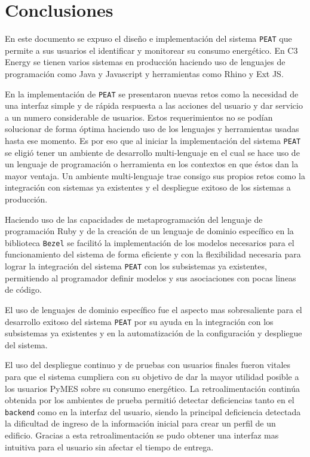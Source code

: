\chapter{Conclusiones}

En este documento se expuso el diseño e implementación del sistema \texttt{PEAT} que
permite a sus usuarios el identificar y monitorear su consumo energético. En C3
Energy se tienen varios sistemas en producción haciendo uso de lenguajes de
programación como Java y Javascript y herramientas como Rhino y Ext JS.

En la implementación de \texttt{PEAT} se presentaron nuevas retos como la necesidad
de una interfaz simple y de rápida respuesta a las acciones del usuario y
dar servicio a un numero considerable de usuarios.
Estos requerimientos no se podían solucionar de forma óptima haciendo uso de los
lenguajes y herramientas usadas hasta ese momento. Es por eso que al iniciar
la implementación del sistema \texttt{PEAT} se eligió tener un ambiente de
desarrollo multi-lenguaje en el cual se hace uso de un lenguaje de programación
o herramienta en los contextos en que éstos dan la mayor ventaja. Un ambiente
multi-lenguaje trae consigo sus propios retos como la integración con sistemas ya
existentes y el despliegue exitoso de los sistemas a producción.

Haciendo uso de las capacidades de metaprogramación del lenguaje de programación
Ruby y de la creación de un lenguaje de dominio específico en la biblioteca
\texttt{Bezel} se facilitó la implementación de los modelos necesarios para
el funcionamiento del sistema de forma eficiente y con la flexibilidad necesaria
para lograr la integración del sistema \texttt{PEAT} con los subsistemas ya
existentes, permitiendo al programador definir modelos y sus asociaciones con
pocas lineas de código.

El uso de lenguajes de dominio específico fue el aspecto mas sobresaliente
para el desarrollo exitoso del sistema \texttt{PEAT} por su ayuda en la
integración con los subsistemas ya existentes y en la automatización de la
configuración y despliegue del sistema.

El uso del despliegue continuo y de pruebas con usuarios finales fueron vitales para
que el sistema cumpliera con su objetivo de dar la mayor utilidad posible
a los usuarios PyMES sobre su consumo energético. La retroalimentación continúa
obtenida por los ambientes de prueba permitió detectar deficiencias tanto en el
\texttt{backend} como en la interfaz del usuario, siendo la principal deficiencia
detectada la dificultad de ingreso de la información inicial para crear un perfil
de un edificio. Gracias a esta retroalimentación se pudo obtener una interfaz
mas intuitiva para el usuario sin afectar el tiempo de entrega.

